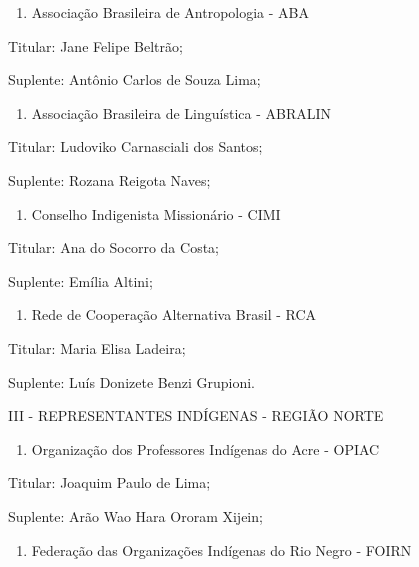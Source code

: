 \documentclass[
]{book}
\providecommand{\tightlist}{%
  \setlength{\itemsep}{0pt}\setlength{\parskip}{0pt}}
\begin{document}
\begin{enumerate}
\def\labelenumi{\alph{enumi})}
\tightlist
\item
  Associação Brasileira de Antropologia - ABA
\end{enumerate}

Titular: Jane Felipe Beltrão;

Suplente: Antônio Carlos de Souza Lima;

\begin{enumerate}
\def\labelenumi{\alph{enumi})}
\setcounter{enumi}{1}
\tightlist
\item
  Associação Brasileira de Linguística - ABRALIN
\end{enumerate}

Titular: Ludoviko Carnasciali dos Santos;

Suplente: Rozana Reigota Naves;

\begin{enumerate}
\def\labelenumi{\alph{enumi})}
\setcounter{enumi}{2}
\tightlist
\item
  Conselho Indigenista Missionário - CIMI
\end{enumerate}

Titular: Ana do Socorro da Costa;

Suplente: Emília Altini;

\begin{enumerate}
\def\labelenumi{\alph{enumi})}
\setcounter{enumi}{3}
\tightlist
\item
  Rede de Cooperação Alternativa Brasil - RCA
\end{enumerate}

Titular: Maria Elisa Ladeira;

Suplente: Luís Donizete Benzi Grupioni.

III - REPRESENTANTES INDÍGENAS - REGIÃO NORTE

\begin{enumerate}
\def\labelenumi{\alph{enumi})}
\tightlist
\item
  Organização dos Professores Indígenas do Acre - OPIAC
\end{enumerate}

Titular: Joaquim Paulo de Lima;

Suplente: Arão Wao Hara Ororam Xijein;

\begin{enumerate}
\def\labelenumi{\alph{enumi})}
\setcounter{enumi}{1}
\tightlist
\item
  Federação das Organizações Indígenas do Rio Negro - FOIRN
\end{enumerate}
\end{document}
